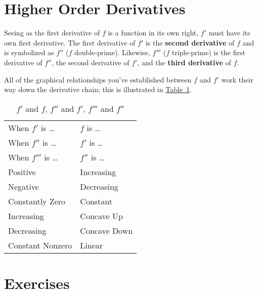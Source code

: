 \documentclass[12pt,]{book}
\newcommand{\terminology}[1]{\textbf{#1}}
\theoremstyle{plain}
\theoremstyle{definition}
\numberwithin{equation}{section}
\newcommand{\hrulemedium}{\noalign{\hrule height 0.07em}}
\newcommand{\hrulethick} {\noalign{\hrule height 0.11em}}
\newcommand{\fd}[1]{#1'}
\newcommand{\sd}[1]{#1''}
\newcommand{\td}[1]{#1'''}
\begin{document}
\section[Higher Order Derivatives]{Higher Order Derivatives}\label{section-higher-order-derivatives}
Seeing as the first derivative of \(f\) is a function in its own right, \(\fd{f}\) must have its own first derivative.  The first derivative of \(\fd{f}\) is the \terminology{second derivative} of \(f\) and is symbolized as \(\sd{f}\) (\(f\) double-prime).  Likewise, \(\td{f}\) (\(f\) triple-prime) is the first derivative of \(\sd{f}\), the second derivative of \(\fd{f}\), and the \terminology{third derivative} of \(f\).%
\par
All of the graphical relationships you’ve established between \(f\) and \(\fd{f}\) work their way down the derivative chain; this is illustrated in \hyperref[table-f-prime-and-f]{Table~\ref*{table-f-prime-and-f}}.%
\begin{table}
\centering
\caption{\(\fd{f}\) and \(f\), \(\sd{f}\) and \(\fd{f}\), \(\td{f}\) and \(\sd{f}\)\label{table-f-prime-and-f}}
\begin{tabular}{ll}\hrulethick
When \(\fd{f}\) is \dots{}&\(f\) is \dots{}\\
When \(\sd{f}\) is \dots{}&\(\fd{f}\) is \dots{}\\
When \(\td{f}\) is \dots{}&\(\sd{f}\) is \dots{}\\\hrulemedium
Positive&Increasing\\
Negative&Decreasing\\
Constantly Zero&Constant\\
Increasing&Concave Up\\
Decreasing&Concave Down\\
Constant Nonzero&Linear
\end{tabular}
\end{table}
\typeout{************************************************}
\typeout{************************************************}
\section*{Exercises}\label{exercises-26}
\end{document}
